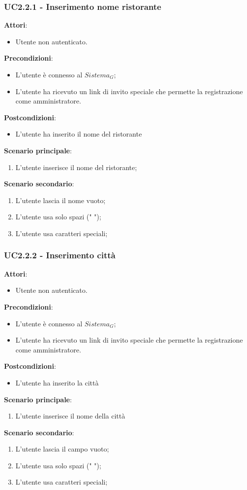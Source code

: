 \subsubsection{UC2.2.1 - Inserimento nome ristorante}\label{usecase:2_2_1}
\textbf{Attori}:
\begin{itemize}
    \item Utente non autenticato.
\end{itemize}
\textbf{Precondizioni}:
\begin{itemize}
    \item L'utente è connesso al $\textit{Sistema}_G$;
    \item L'utente ha ricevuto un link di invito speciale che permette la registrazione come amministratore.
\end{itemize}
\textbf{Postcondizioni}:
\begin{itemize}
    \item L'utente ha inserito il nome del ristorante
\end{itemize}
\textbf{Scenario principale}:
\begin{enumerate}
    \item L'utente inserisce il nome del ristorante;
\end{enumerate}
\textbf{Scenario secondario}:
\begin{enumerate}
    \item L'utente lascia il nome vuoto;
    \item L'utente usa solo spazi (" ");
    \item L'utente usa caratteri speciali;
\end{enumerate}
\subsubsection{UC2.2.2 - Inserimento città}\label{usecase:2_2_2}
\textbf{Attori}:
\begin{itemize}
    \item Utente non autenticato.
\end{itemize}
\textbf{Precondizioni}:
\begin{itemize}
    \item L'utente è connesso al $\textit{Sistema}_G$;
    \item L'utente ha ricevuto un link di invito speciale che permette la registrazione come amministratore.
\end{itemize}
\textbf{Postcondizioni}:
\begin{itemize}
    \item L'utente ha inserito la città
\end{itemize}
\textbf{Scenario principale}:
\begin{enumerate}
    \item L'utente inserisce il nome della città
\end{enumerate}
\textbf{Scenario secondario}:
\begin{enumerate}
    \item L'utente lascia il campo vuoto;
    \item L'utente usa solo spazi (" ");
    \item L'utente usa caratteri speciali;
\end{enumerate}

